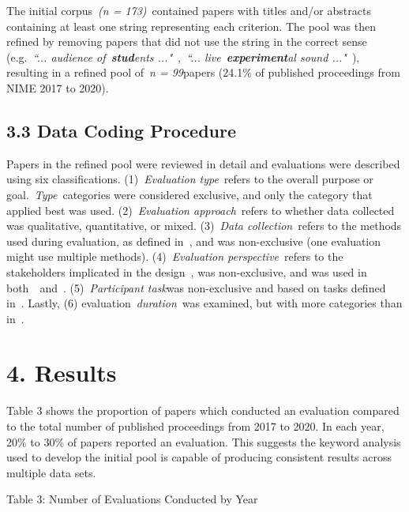 \documentclass[sigconf]{nimeart}
\begin{document}
The initial corpus~\emph{(n = 173)}~contained papers with titles and/or abstracts containing at least one string representing each criterion. The pool was then refined by removing papers that did not use the string in the correct sense (e.g.~\emph{``... audience of~}\textbf{\emph{stud}}\emph{ents ..."}~\cite{c22},~\emph{``... live~}\textbf{\emph{experiment}}\emph{al sound ..."}~\cite{c23}), resulting in a refined pool of~\emph{n = 99}papers (24.1\% of published proceedings from NIME 2017 to 2020).~

\subsection{3.3 Data Coding Procedure}\label{data-coding-procedure}

Papers in the refined pool were reviewed in detail and evaluations were described using six classifications. (1)~\emph{Evaluation type}~refers to the overall purpose or goal.~\emph{Type}~categories were considered exclusive, and only the category that applied best was used. (2)~\emph{Evaluation approach}~refers to whether data collected was qualitative, quantitative, or mixed. (3)~\emph{Data collection}~refers to the methods used during evaluation, as defined in~\cite{c3}, and was non-exclusive (one evaluation might use multiple methods). (4)~\emph{Evaluation perspective}~refers to the stakeholders implicated in the design~\cite{c13}, was non-exclusive, and was used in both~\cite{c2}~and~\cite{c3}. (5)~\emph{Participant task}was non-exclusive and based on tasks defined in~\cite{c3}. Lastly, (6) evaluation~\emph{duration}~was examined, but with more categories than in~\cite{c2}.~

\section{4. Results}\label{results}

Table 3 shows the proportion of papers which conducted an evaluation compared to the total number of published proceedings from 2017 to 2020. In each year, 20\% to 30\% of papers reported an evaluation. This suggests the keyword analysis used to develop the initial pool is capable of producing consistent results across multiple data sets.

Table 3: Number of Evaluations Conducted by Year
\end{document}
